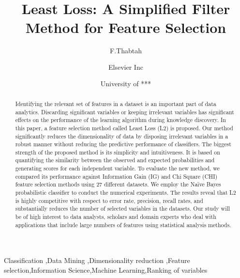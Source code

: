 \documentclass[review]{elsarticle}
\begin{document}
\begin{frontmatter}

\title{Least Loss: A Simplified Filter Method for Feature Selection}

\author{F.Thabtah}
\address{ address *** **, ****}


\author[mymainaddress,mysecondaryaddress]{Elsevier Inc}

\author[Fadi Thabtah]{ University of *** }


\begin{abstract}
Identifying the relevant set of features in a dataset is an important part of data analytics.  Discarding significant variables or keeping irrelevant variables has significant effects on the performance of the learning algorithm during knowledge discovery. In this paper, a feature selection method called Least Loss (L2) is proposed. Our method significantly reduces the dimensionality of data by disposing irrelevant variables in a robust manner without reducing the predictive performance of classifiers. The biggest strength of the proposed method is its simplicity and intuitiveness. It is based on quantifying the similarity between the observed and expected probabilities and generating scores for each independent variable. To evaluate the new method, we compared its performance against Information Gain (IG) and Chi Square (CHI) feature selection methods using 27 different datasets. We employ the Naïve Bayes probabilistic classifier to conduct the numerical experiments. The results reveal that L2 is highly competitive with respect to error rate, precision, recall rates, and substantially reduces the number of selected variables in the datasets. Our study will be of high interest to data analysts, scholars and domain experts who deal with applications that include large numbers of features using statistical analysis methods. 
\end{abstract}

\begin{keyword}
Classification \sep Data Mining \sep Dimensionality reduction \sep Feature selection\sep Information Science\sep Machine Learning\sep Ranking of variables

\end{keyword}

\end{frontmatter}
\end{document}
